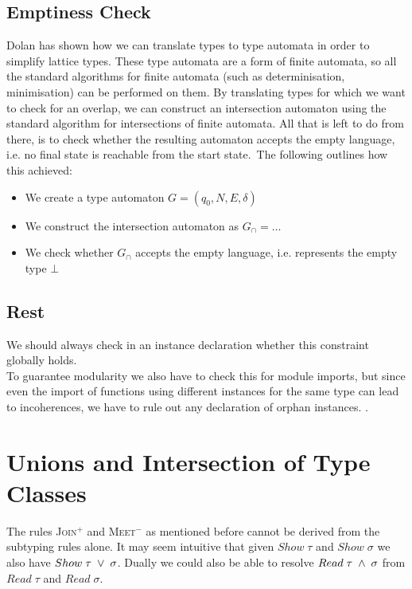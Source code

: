   \subsection{Emptiness Check}

  Dolan \cite{downen2017phd} has shown how we can translate types to type automata in order to simplify lattice types.
  These type automata are a form of finite automata, so all the standard algorithms for finite automata (such as determinisation, minimisation) can be performed on them.
  By translating types for which we want to check for an overlap, we can construct an intersection automaton using the standard algorithm for intersections of finite automata.
  All that is left to do from there, is to check whether the resulting automaton accepts the empty language,  i.e. no final state is reachable from the start state.\
  The following outlines how this achieved:

  \begin{itemize}
    \item We create a type automaton $G = (q_0, N, E, \delta)$
    \item We construct the intersection automaton as $G_\cap = \dots$
    \item We check whether $G_\cap$ accepts the empty language, i.e. represents the empty type $\bot$
  \end{itemize}

  \subsection{Rest}
  We should always check in an instance declaration whether this constraint globally holds. \\
  To guarantee modularity we also have to check this for module imports, but since even the import of functions using different instances for the same type can lead to incoherences, we have to rule out any declaration of orphan instances.
  \cite{Kilpatrick2019-cy}.

\section{Unions and Intersection of Type Classes}

The rules \textsc{Join}$^+$ and \textsc{Meet}$^-$ as mentioned before cannot be derived from the subtyping rules alone.
It may seem intuitive that given $Show \; \tau$ and $Show \; \sigma$ we also have $Show \; \tau \; \vee \; \sigma$.
Dually we could also be able to resolve $Read \; \tau \; \wedge \; \sigma$ from $Read \; \tau$ and $Read \; \sigma$.

